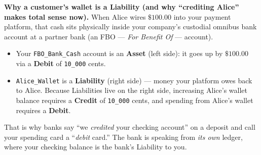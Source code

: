 \begin{intuitionbox}
\textbf{Why a customer's wallet is a Liability (and why ``crediting Alice'' makes total sense now).} When Alice wires $\$100.00$ into your payment platform, that cash sits physically inside your company's custodial omnibus bank account at a partner bank (an FBO --- \emph{For Benefit Of} --- account).
\begin{itemize}
  \item Your \texttt{FBO\_Bank\_Cash} account is an \textbf{Asset} (left side): it goes up by $\$100.00$ via a \textbf{Debit} of \texttt{10\_000} cents.
  \item \texttt{Alice\_Wallet} is a \textbf{Liability} (right side) --- money your platform owes back to Alice. Because Liabilities live on the right side, increasing Alice's wallet balance requires a \textbf{Credit} of \texttt{10\_000} cents, and spending from Alice's wallet requires a \textbf{Debit}.
\end{itemize}
That is why banks say ``we \emph{credited} your checking account'' on a deposit and call your spending card a ``\emph{debit} card.'' The bank is speaking from \emph{its own} ledger, where your checking balance is the bank's Liability to you.
\end{intuitionbox}


